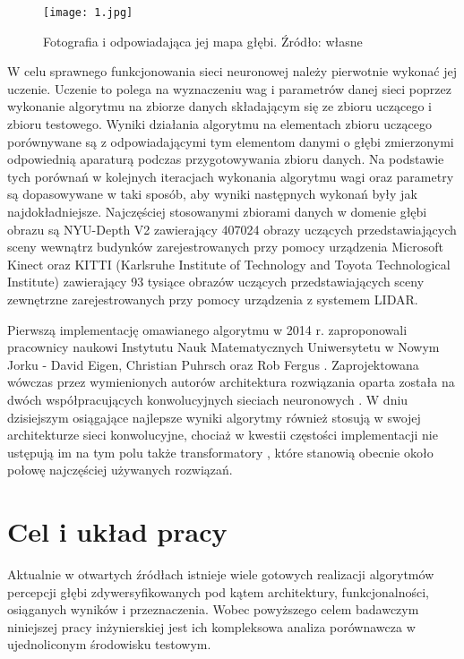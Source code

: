 \begin{figure}[H]
        \centering
        \texttt{[image: 1.jpg]}
        \caption{Fotografia i odpowiadająca jej mapa głębi. Źródło: własne}
        \label{fig:depthmap}
 \end{figure}

W celu sprawnego funkcjonowania sieci neuronowej należy pierwotnie wykonać jej uczenie. Uczenie to polega na wyznaczeniu wag i parametrów danej sieci poprzez wykonanie algorytmu na zbiorze danych składającym się ze zbioru uczącego i zbioru testowego. Wyniki działania algorytmu na elementach zbioru uczącego porównywane są z odpowiadającymi tym elementom danymi o głębi zmierzonymi odpowiednią aparaturą podczas przygotowywania zbioru danych. Na podstawie tych porównań w kolejnych iteracjach wykonania algorytmu wagi oraz parametry są dopasowywane w taki sposób, aby wyniki następnych wykonań były jak najdokładniejsze. Najczęściej stosowanymi zbiorami danych w domenie głębi obrazu są NYU-Depth V2 \cite{couprie2013} zawierający 407024 obrazy uczących przedstawiających sceny wewnątrz budynków zarejestrowanych przy pomocy urządzenia Microsoft Kinect oraz KITTI (Karlsruhe Institute of Technology and Toyota Technological Institute) \cite{geiger2012} zawierający 93 tysiące obrazów uczących przedstawiających sceny zewnętrzne zarejestrowanych przy pomocy urządzenia z systemem LIDAR.

Pierwszą implementację omawianego algorytmu w 2014 r. zaproponowali pracownicy naukowi Instytutu Nauk Matematycznych Uniwersytetu w Nowym Jorku - David Eigen, Christian Puhrsch oraz Rob Fergus \cite{eigen2014}. Zaprojektowana wówczas przez wymienionych autorów architektura rozwiązania oparta została na dwóch współpracujących konwolucyjnych sieciach neuronowych \cite{oshea2015}. W dniu dzisiejszym osiągające najlepsze wyniki algorytmy również stosują w swojej architekturze sieci konwolucyjne, chociaż w kwestii częstości implementacji nie ustępują im na tym polu także transformatory \cite{vaswani2017}, które stanowią obecnie około połowę najczęściej używanych rozwiązań.

\section{Cel i układ pracy}
Aktualnie w otwartych źródłach istnieje wiele gotowych realizacji algorytmów percepcji głębi zdywersyfikowanych pod kątem architektury, funkcjonalności, osiąganych wyników i przeznaczenia. Wobec powyższego celem badawczym niniejszej pracy inżynierskiej jest ich kompleksowa analiza porównawcza w ujednoliconym środowisku testowym.

